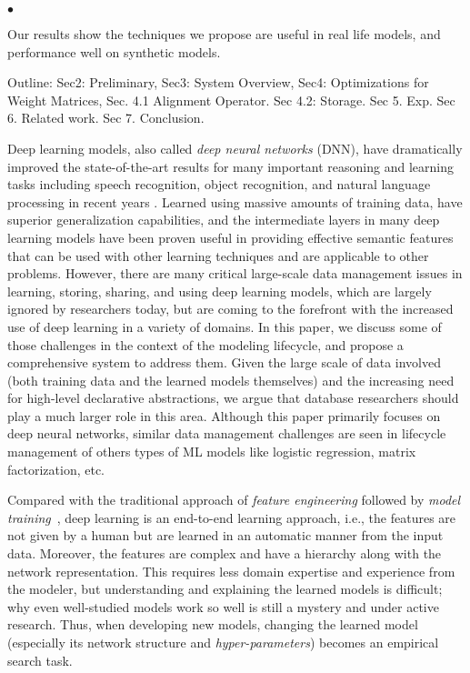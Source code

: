 \documentclass[conference]{IEEEtran}
\begin{document}
{\begin{list}{$\bullet$}{\leftmargin 0.15in \topsep 0pt \itemsep -3pt}
\begin{enumerate}
\end{enumerate}
\item Our results show the techniques we propose are useful in real life models, and performance well on synthetic models. 
\item Outline: Sec2: Preliminary, Sec3: System Overview, Sec4: Optimizations for Weight Matrices, Sec. 4.1 Alignment Operator. Sec 4.2: Storage. Sec 5. Exp. Sec 6. Related work. Sec 7. Conclusion.
\end{list}


\quad \vfill
\pagebreak 
}

Deep learning models, also called {\em deep neural networks} (DNN), have dramatically improved the state-of-the-art results for many important reasoning and learning tasks including speech recognition, object recognition, and natural language processing in recent years \cite{lecun2015nature}. 
Learned using massive amounts of training data, \dnn\models have superior generalization capabilities, and the intermediate layers in many deep learning models have been proven useful in providing effective semantic features that can be used with other learning techniques and are applicable to other problems.
However, there are many critical large-scale data management issues in learning, storing, sharing, and using deep learning models, which are largely ignored by researchers today, but are coming to the forefront with the increased use of deep learning in a variety of domains. 
In this paper, we discuss some of those challenges in the context of the modeling lifecycle, and propose a comprehensive system to address them. Given the large scale of data involved (both training data and the learned models themselves) and the increasing need for high-level declarative abstractions, we argue that database researchers should play a much larger role in this area. Although this paper primarily focuses on deep neural networks, similar data management challenges are seen in lifecycle management of others types of ML models like logistic regression, matrix factorization, etc.






Compared with the traditional approach of {\em feature engineering} followed by {\em model training}~\cite{ce2014sigmod}, deep learning is an end-to-end learning approach, i.e., the features are not given by a human but are learned in an automatic manner from the input data. Moreover, the features are complex and have a hierarchy along with the network representation. 
This requires less domain expertise and experience from the modeler, but
understanding and explaining the learned models is difficult; why even well-studied models work so well is still a mystery and under active research. 
Thus, when developing new models, changing the learned model (especially its network structure and {\em hyper-parameters}) becomes an empirical search task. 
\end{document}
